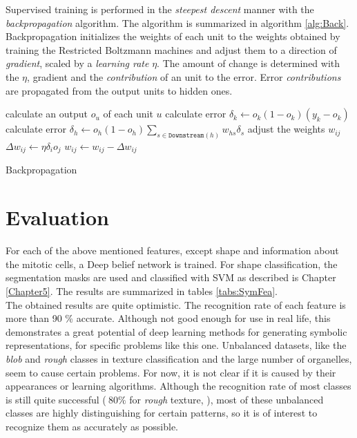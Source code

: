 Supervised training is performed in the \textit{steepest descent} manner with the \textit{backpropagation} algorithm. The algorithm is summarized in algorithm \ref{alg:Back}. Backpropagation initializes the weights of each unit to the weights obtained by training the Restricted Boltzmann machines and adjust them to a direction of \textit{gradient}, scaled by a \textit{learning rate} $\eta$. The amount of change is determined with the $\eta$, gradient and the \textit{contribution} of an unit to the error. Error \textit{contributions} are propagated from the output units to hidden ones. 

\begin{algorithm}
	\begin{algorithmic}[1]
					\State calculate an output  $o_u$ of each unit $u$
						\State calculate error $\delta_k \gets o_k(1-o_k)(y_k - o_k)$					
					\EndFor 
						\State calculate error $\delta_h \gets o_h(1-o_h)\sum_{s \in \mathtt{Downstream}(h)}w_{hs}\delta_s$ 					
					\EndFor
					\State adjust the weights $w_{ij}$
					\Statex \quad \quad $\Delta w_{ij} \gets \eta \delta_i o_j$ 
					\Statex \quad \quad $w_{ij} \gets w_{ij} - \Delta w_{ij}$
				\EndFor
			\EndWhile
		\EndFunction
	\end{algorithmic}
	\caption{Backpropagation}
	\label{alg:Back}
\end{algorithm} 




\section{Evaluation}

For each of the above mentioned features, except shape and information about the mitotic cells, a Deep belief network is trained. For shape classification, the segmentation masks are used and classified with SVM as described is Chapter \ref{Chapter5}. The results are summarized in tables \ref{tabs:SymFea}. \\

The obtained results are quite optimistic. The recognition rate of each feature is more than 90 \% accurate. Although not good enough for use in real life, this demonstrates a great potential of deep learning methods for generating symbolic representations, for specific problems like this one. Unbalanced datasets, like the \textit{blob} and \textit{rough} classes in texture classification and the large number of organelles, seem to cause certain problems. For now, it is not clear if it is caused by their appearances or learning algorithms. Although the recognition rate of most classes is still quite successful ($~ 80 \%$ for \textit{rough} texture, ),  most of these unbalanced classes are highly distinguishing for certain patterns, so it is of interest to recognize them as accurately as possible. \\

